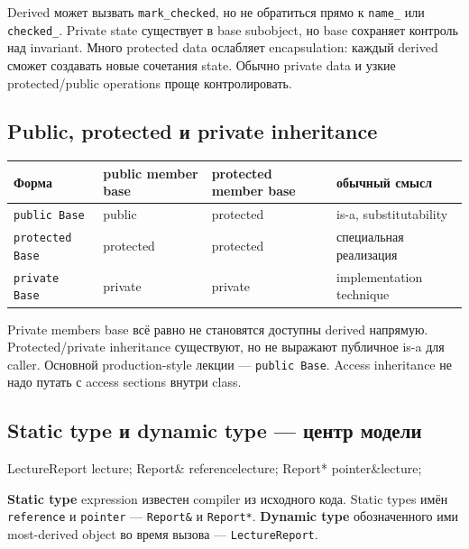 Derived может вызвать \texttt{mark\_checked}, но не обратиться прямо к
\texttt{name\_} или \texttt{checked\_}. Private state существует в base
subobject, но base сохраняет контроль над invariant. Много protected data
ослабляет encapsulation: каждый derived сможет создавать новые сочетания
state. Обычно private data и узкие protected/public operations проще
контролировать.

\subsection{Public, protected и private inheritance}

\begin{center}\small
\begin{tabularx}{\textwidth}{@{}lXXX@{}}
\toprule
Форма & public member base & protected member base & обычный смысл \\
\midrule
\texttt{public Base} & public & protected & is-a, substitutability \\
\texttt{protected Base} & protected & protected & специальная реализация \\
\texttt{private Base} & private & private & implementation technique \\
\bottomrule
\end{tabularx}
\end{center}

Private members base всё равно не становятся доступны derived напрямую.
Protected/private inheritance существуют, но не выражают публичное is-a для
caller. Основной production-style лекции --- \texttt{public Base}. Access
inheritance не надо путать с access sections внутри class.

\subsection{Static type и dynamic type --- центр модели}

\begin{cppcode}
LectureReport lecture;
Report& reference{lecture};
Report* pointer{&lecture};
\end{cppcode}

\begin{definition}
\textbf{Static type} expression известен compiler из исходного кода. Static
types имён \texttt{reference} и \texttt{pointer} --- \texttt{Report\&} и
\texttt{Report*}. \textbf{Dynamic type} обозначенного ими most-derived object
во время вызова --- \texttt{LectureReport}.
\end{definition}

